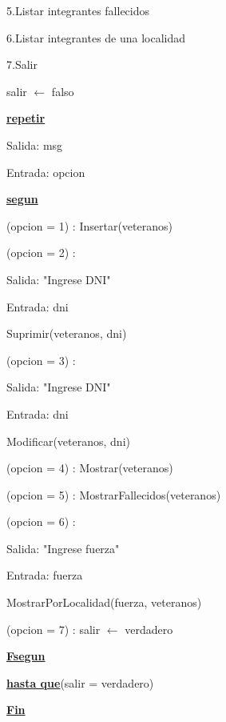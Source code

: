 \documentclass{article}
\begin{document}
        \hspace{17mm}5.Listar integrantes fallecidos

        \hspace{17mm}6.Listar integrantes de una localidad

        \hspace{17mm}7.Salir

    \hspace{4mm}salir $\leftarrow$ falso

    \hspace{4mm}\underline{\textbf{repetir}} 

    \hspace{8mm}Salida: msg

    \hspace{8mm}Entrada: opcion

    \hspace{8mm}\underline{\textbf{segun}}

    \hspace{12mm}(opcion = 1) : Insertar(veteranos)

    \hspace{12mm}(opcion = 2) :

        \hspace{16mm}Salida: "Ingrese DNI"

        \hspace{16mm}Entrada: dni
        
        \hspace{16mm}Suprimir(veteranos, dni)

    \hspace{12mm}(opcion = 3) : 
    
        \hspace{16mm}Salida: "Ingrese DNI"

        \hspace{16mm}Entrada: dni
        
        \hspace{16mm}Modificar(veteranos, dni)

    \hspace{12mm}(opcion = 4) : Mostrar(veteranos)

    \hspace{12mm}(opcion = 5) : MostrarFallecidos(veteranos)

    \hspace{12mm}(opcion = 6) : 
    
        \hspace{16mm}Salida: "Ingrese fuerza"

        \hspace{16mm}Entrada: fuerza

        \hspace{16mm}MostrarPorLocalidad(fuerza, veteranos)

    \hspace{12mm}(opcion = 7) : salir $\leftarrow$ verdadero

    \hspace{8mm}\underline{\textbf{Fsegun}}

    \hspace{4mm}\underline{\textbf{hasta que}}(salir = verdadero)

    \underline{\textbf{Fin}}
\end{document}
